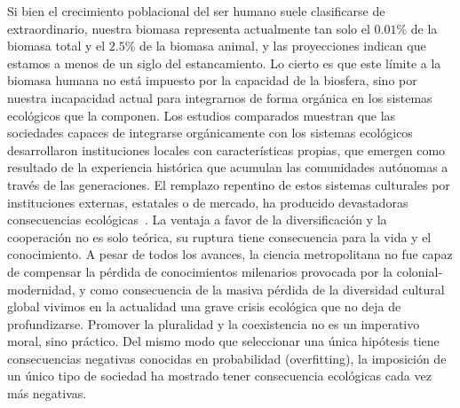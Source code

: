 \documentclass[a4paper,11pt]{book}
\theoremstyle{definition}
\begin{document}
Si bien el crecimiento poblacional del ser humano suele clasificarse de extraordinario, nuestra biomasa representa actualmente tan solo el $0.01$\% de la biomasa total y el $2.5$\% de la biomasa animal, y las proyecciones indican que estamos a menos de un siglo del estancamiento.
%
Lo cierto es que este l\'imite a la biomasa humana no est\'a impuesto por la capacidad de la biosfera, sino por nuestra incapacidad actual para integrarnos de forma org\'anica en los sistemas ecol\'ogicos que la componen.
%
Los estudios comparados muestran que las sociedades capaces de integrarse org\'anicamente con los sistemas ecol\'ogicos desarrollaron instituciones locales con caracter\'isticas propias, que emergen como resultado de la experiencia hist\'orica que acumulan las comunidades aut\'onomas a trav\'es de las generaciones.
%
El remplazo repentino de estos sistemas culturales por instituciones externas, estatales o de mercado, ha producido devastadoras consecuencias ecol\'ogicas~\cite{segato2013-colonialidad}.
%
La ventaja a favor de la diversificaci\'on y la cooperaci\'on no es solo te\'orica, su ruptura tiene consecuencia para la vida y el conocimiento.
%
A pesar de todos los avances, la ciencia metropolitana no fue capaz de compensar la p\'erdida de conocimientos milenarios provocada por la colonial-modernidad, y como consecuencia de la masiva p\'erdida de la diversidad cultural global vivimos en la actualidad una grave crisis ecol\'ogica que no deja de profundizarse.
%
Promover la pluralidad y la coexistencia no es un imperativo moral, sino pr\'actico.
%
Del mismo modo que seleccionar una \'unica hip\'otesis tiene consecuencias negativas conocidas en probabilidad (overfitting), la imposici\'on de un \'unico tipo de sociedad ha mostrado tener consecuencia ecol\'ogicas cada vez m\'as negativas.
\end{document}
